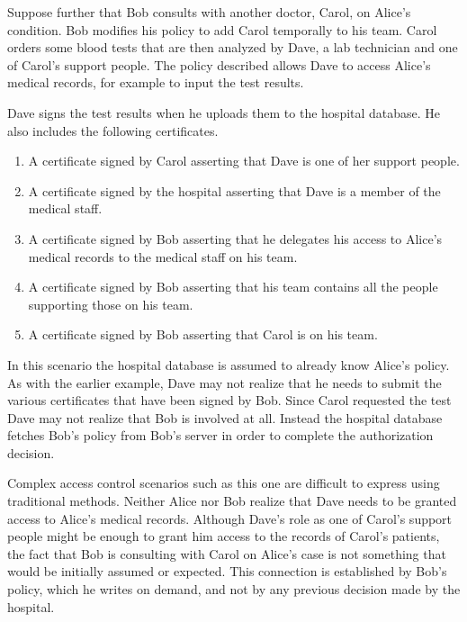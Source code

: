 \documentclass{article}
\begin{document}
Suppose further that Bob consults with another doctor, Carol, on Alice's
condition. Bob modifies his policy to add Carol temporally to his team.
Carol orders some blood tests that are then analyzed by Dave, a lab
technician and one of Carol's support people. The policy described allows
Dave to access Alice's medical records, for example to input the test
results.

Dave signs the test results when he uploads them to the hospital database.
He also includes the following certificates.

\begin{enumerate}
\item A certificate signed by Carol asserting that Dave is one of her support
  people.

\item A certificate signed by the hospital asserting that Dave is a member of
  the medical staff.

\item A certificate signed by Bob asserting that he delegates his access to
  Alice's medical records to the medical staff on his team.

\item A certificate signed by Bob asserting that his team contains all
  the people supporting those on his team.

\item A certificate signed by Bob asserting that Carol is on his team.
\end{enumerate}

In this scenario the hospital database is assumed to already know Alice's
policy. As with the earlier example, Dave may not realize that he needs to
submit the various certificates that have been signed by Bob. Since Carol
requested the test Dave may not realize that Bob is involved at all.
Instead the hospital database fetches Bob's policy from Bob's server in
order to complete the authorization decision.

Complex access control scenarios such as this one are difficult to express
using traditional methods. Neither Alice nor Bob realize that Dave needs to
be granted access to Alice's medical records. Although Dave's role as one
of Carol's support people might be enough to grant him access to the
records of Carol's patients, the fact that Bob is consulting with Carol on
Alice's case is not something that would be initially assumed or expected.
This connection is established by Bob's policy, which he writes on demand,
and not by any previous decision made by the hospital.
\end{document}
